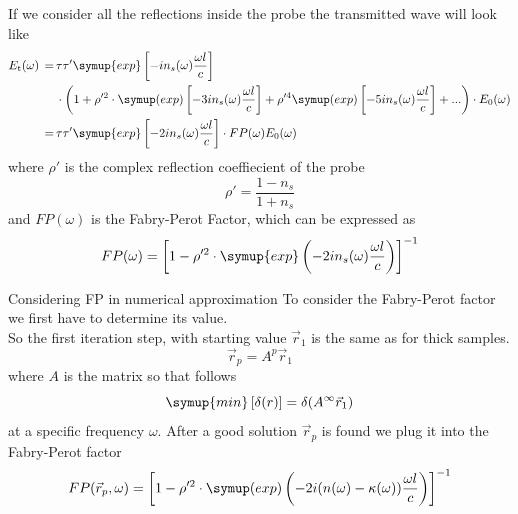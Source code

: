 \documentclass[aspectratio=1610, 9pt]{beamer}
\begin{document}
\begin{frame}
  If we consider all the reflections inside the probe the transmitted wave will look like
  \begin{align*}
    E_\text{t}(\omega) \,=\,& \tau \tau' \symup{exp} \left[-i n_s(\omega) \frac{\omega l }{c}\right] \\
                        & \cdot \left( 1 + \rho'^2 \cdot \symup(exp)\left[ -3 i n_s(\omega) \frac{\omega l }{c}\right] + \rho'^4 \symup(exp) \left[ -5 i n_s(\omega) \frac{\omega l }{c}\right] + ...\right) \cdot E_0 (\omega) \\
                        \,=\,& \tau \tau' \symup{exp}\left[ -2 i n_s(\omega) \frac{\omega l }{c}\right] \cdot FP(\omega) E_0(\omega)
  \end{align*}
  where $\rho'$ is the complex reflection coeffiecient of the probe
  \begin{equation}
    \rho' = \frac{1 - n_s}{1 + n_s}
  \end{equation}
  and $FP(\omega)$ is the Fabry-Perot Factor, which can be expressed as 
  \begin{equation}
    FP(\omega) = \left[1 - \rho'^2 \cdot \symup{exp}\left(- 2 i n_s(\omega )\frac{\omega l }{c}\right)\right]^{-1}
  \end{equation}
\end{frame}

\begin{frame}{Considering FP in numerical approximation}
  To consider the Fabry-Perot factor we first have to determine its value.\\
  So the first iteration step, with starting value $\vec{r}_1$ is the same as for thick samples.
  \begin{equation}
    \vec{r}_p = A^p \vec{r}_1
  \end{equation}  
  where $A$ is the matrix so that follows
  \begin{equation}
    \symup{min} \left[ \delta(r)\right] = \delta(A^\infty \vec{r}_1)
  \end{equation}
  at a specific frequency $\omega$.
  After a good solution $\vec{r}_p$ is found we plug it into the Fabry-Perot factor
  \begin{equation}
    FP(\vec{r}_p, \omega) = \left[1 - \rho'^2 \cdot \symup(exp)\left(- 2 i (n(\omega) - \kappa(\omega))\frac{\omega l }{c}\right)\right]^{-1}
  \end{equation}
\end{frame}
\end{document}
